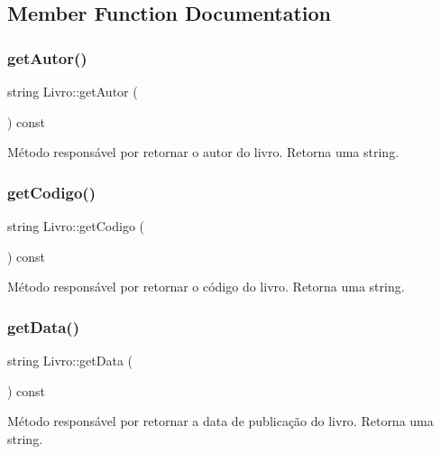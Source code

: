 \subsection{Member Function Documentation}
\mbox{\label{classLivro_ae8f2ea7e82a3ddd33e1d0e242c43f3e5}} 
\subsubsection{\texorpdfstring{get\+Autor()}{getAutor()}}
{\footnotesize\ttfamily string Livro\+::get\+Autor (\begin{DoxyParamCaption}{ }\end{DoxyParamCaption}) const\hspace{0.3cm}{\ttfamily [inline]}}

Método responsável por retornar o autor do livro. Retorna uma string. \mbox{\label{classLivro_ac0bf6014dae1a0a3cb15ffac8b886f13}} 
\subsubsection{\texorpdfstring{get\+Codigo()}{getCodigo()}}
{\footnotesize\ttfamily string Livro\+::get\+Codigo (\begin{DoxyParamCaption}{ }\end{DoxyParamCaption}) const\hspace{0.3cm}{\ttfamily [inline]}}

Método responsável por retornar o código do livro. Retorna uma string. \mbox{\label{classLivro_aaf7d614049f22c09631bae2a5f83c16a}} 
\subsubsection{\texorpdfstring{get\+Data()}{getData()}}
{\footnotesize\ttfamily string Livro\+::get\+Data (\begin{DoxyParamCaption}{ }\end{DoxyParamCaption}) const\hspace{0.3cm}{\ttfamily [inline]}}

Método responsável por retornar a data de publicação do livro. Retorna uma string. \mbox{\label{classLivro_a00b6085b059571efab6d29630cf95a50}} 
